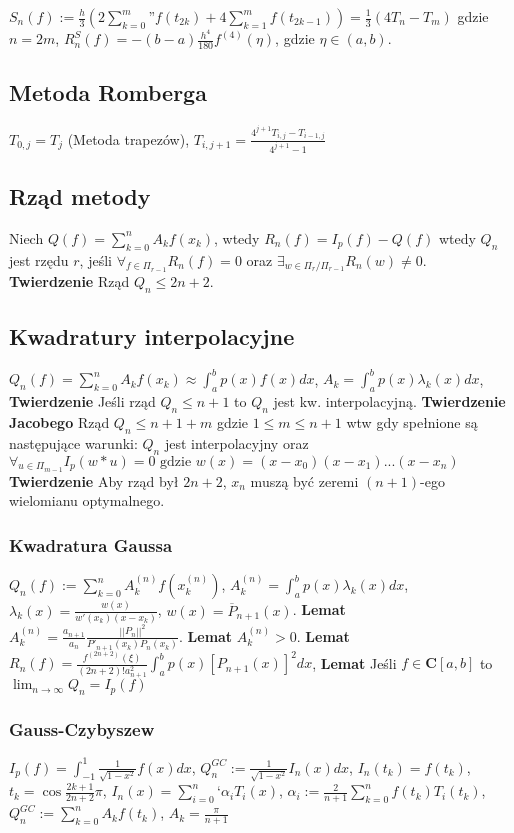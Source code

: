 \documentclass{article}
\begin{document}
\begin{minipage}[t]{.33\textwidth}


 $S_n(f) := \frac{h}{3}(2\sum_{k=0}^m\text{''}f(t_{2k}) + 4\sum_{k=1}^mf(t_{2k-1})) = \frac{1}{3}(4T_n - T_m)$ gdzie $n = 2m$, $R_n^S(f) = -(b-a)\frac{h^4}{180}f^{(4)}(\eta)$, gdzie $\eta \in (a,b)$.
\subsection*{Metoda Romberga}
$T_{0,j} = T_j $ (Metoda trapezów), $T_{i,j+1} = \frac{4^{j+1}T_{i,j}-T_{i-1,j}}{4^{j+1} - 1}$
\subsection*{Rząd metody}
Niech $Q(f) = \sum_{k=0}^nA_kf(x_k)$, wtedy $R_n(f) = I_p(f) - Q(f)$ wtedy $Q_n$ jest rzędu $r$, jeśli $\forall_{f\in \Pi_{r-1}} R_n(f) = 0$ oraz $\exists_{w \in \Pi_{r}/ \Pi_{r-1} } R_n(w) \neq 0$. \textbf{Twierdzenie} Rząd $Q_n \leq 2n+2$.
\subsection*{Kwadratury interpolacyjne}
$Q_n(f) = \sum_{k=0}^n A_k f(x_k) \approx \int_a^b p(x)f(x)dx$, $A_k = \int_a^b p(x) \lambda_k(x)dx$, \textbf{Twierdzenie} Jeśli rząd $Q_n \leq n+1$ to $Q_n$ jest kw. interpolacyjną. \textbf{Twierdzenie Jacobego} Rząd $Q_n \leq n+1+m$ gdzie $1 \leq m \leq n+1$ wtw gdy spełnione są następujące warunki: $Q_n$ jest interpolacyjny oraz $\forall_{u \in \Pi_{m-1}} I_p(w*u) = 0 \text{  gdzie } w(x) = (x-x_0)(x-x_1)...(x-x_n)$ \textbf{Twierdzenie} Aby rząd był $2n+2$, $x_n$ muszą być zeremi $(n+1)$-ego wielomianu optymalnego.
\subsubsection*{Kwadratura Gaussa}
$Q_n(f) := \sum_{k=0}^nA_k^{(n)}f(x_k^{(n)})$, $A_k^{(n)} = \int_a^b p(x)\lambda_k(x)dx$, $\lambda_k(x) = \frac{w(x)}{w'(x_k)(x-x_k)}$, $w(x) = \overline{P}_{n+1}(x)$. \textbf{Lemat} $A_k^{(n)} = \frac{a_{n+1}}{a_n}\frac{||P_n||^2}{P'_{n+1}(x_k)P_n(x_k)}$. \textbf{Lemat} $A_k^{(n)} > 0$. \textbf{Lemat} $R_n(f) = \frac{f^{(2n+2)}(\xi)}{(2n+2)!a_{n+1}^2}\int_a^bp(x)[P_{n+1}(x)]^2dx$, \textbf{Lemat} Jeśli $f\in \mathbf{C}[a,b]$ to $\lim_{n\rightarrow\infty}Q_n = I_p(f)$
\subsubsection*{Gauss-Czybyszew}
$I_p(f) = \int_{-1}^{1}\frac{1}{\sqrt{1-x^2}}f(x)dx$, $Q^{GC}_n := \frac{1}{\sqrt{1-x^2}}I_n(x)dx$, $I_n(t_k) = f(t_k)$, $t_k = \cos{\frac{2k+1}{2n+2}\pi}$, $I_n(x) = \sum_{i=0}^n\text{`}\alpha_i T_i(x)$, $\alpha_i := \frac{2}{n+1}\sum_{k=0}^nf(t_k)T_i(t_k)$, $Q_n^{GC} := \sum_{k=0}^n A_kf(t_k)$, $A_k = \frac{\pi}{n+1}$

\end{minipage}
\end{document}
